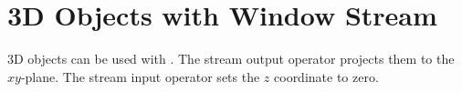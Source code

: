 \section{3D Objects with Window Stream}

3D objects can be used with . The stream output
operator \ccc{<<} projects them to the $xy$-plane. The stream input
operator \ccc{>>} sets the $z$ coordinate to zero.


